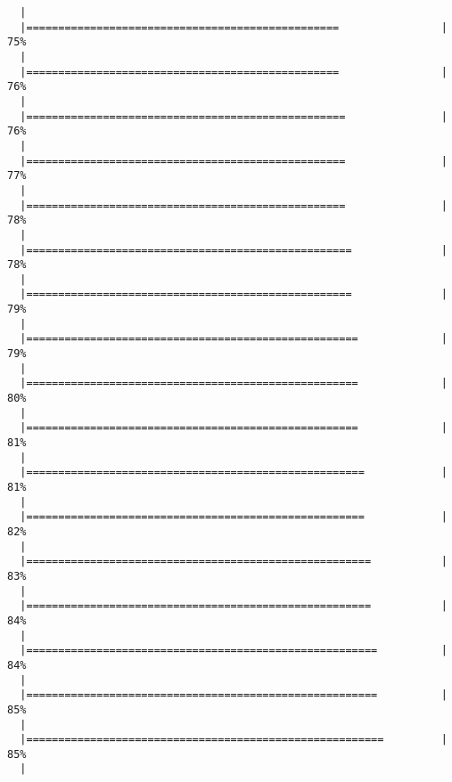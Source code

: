 \begin{knitrout}
\begin{kframe}
\begin{verbatim}
  |                                                                       
  |=================================================                |  75%
  |                                                                       
  |=================================================                |  76%
  |                                                                       
  |==================================================               |  76%
  |                                                                       
  |==================================================               |  77%
  |                                                                       
  |==================================================               |  78%
  |                                                                       
  |===================================================              |  78%
  |                                                                       
  |===================================================              |  79%
  |                                                                       
  |====================================================             |  79%
  |                                                                       
  |====================================================             |  80%
  |                                                                       
  |====================================================             |  81%
  |                                                                       
  |=====================================================            |  81%
  |                                                                       
  |=====================================================            |  82%
  |                                                                       
  |======================================================           |  83%
  |                                                                       
  |======================================================           |  84%
  |                                                                       
  |=======================================================          |  84%
  |                                                                       
  |=======================================================          |  85%
  |                                                                       
  |========================================================         |  85%
  |                                                                       

\end{verbatim}
\end{kframe}
\end{knitrout}
